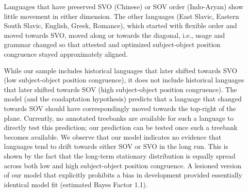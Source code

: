 \documentclass[11pt,a4paper]{article}
\newcommand\comment[1]{{\color{red}#1}}
\newcommand\mhahn[1]{{\color{red}(#1)}}
\begin{document}
Languages that have preserved SVO (Chinese) or SOV order (Indo-Aryan) show little movement in either dimension.
The other languages (East Slavic, Eastern South Slavic, English, Greek, Romance), which started with flexible order and moved towards SVO, moved along or towards the diagonal, i.e., usage and grammar changed so that attested and optimized subject-object position congruence stayed approximately aligned.



While our sample includes historical languages that later shifted towards SVO (low subject-object position congruence), it does not include historical languages that later shifted towards SOV (high subject-object position congruence).
The model (and the coadaptation hypothesis) predicts that a language that changed towards SOV should have correspondingly moved towards the top-right of the plane. 
Currently, no annotated treebanks are available for such a language to directly test this prediction; our prediction can be tested once such a treebank becomes available.
We observe that our model indicates no evidence that languages tend to drift towards either SOV or SVO in the long run.
This is shown by the fact that the long-term stationary distribution is equally spread across both low and high subject-object position congruence.
A lesioned version of our model that explicitly prohibits a bias in development provided essentially identical model fit (estimated Bayes Factor 1.1).
\end{document}
